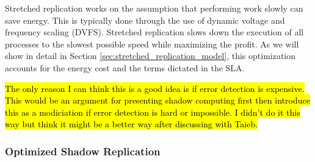 Stretched replication works on the assumption that performing work
slowly can save energy. This is typically done through the use of
dynamic voltage and frequency scaling (DVFS). Stretched replication
slows down the execution of all processes to the slowest possible
speed while maximizing the profit. As we will show in detail in
Section \ref{sec:stretched_replication_model}, this optimization
accounts for the energy cost and the terms dictated in the SLA.

\hl{The only reason I can think this is a good idea is if error
  detection is expensive. This would be an argument for presenting
  shadow computing first then introduce this as a modiciation if error
  detection is hard or impossible. I didn't do it this way but think
  it might be a better way after discussing with Taieb.}

\subsubsection{Optimized Shadow Replication}



